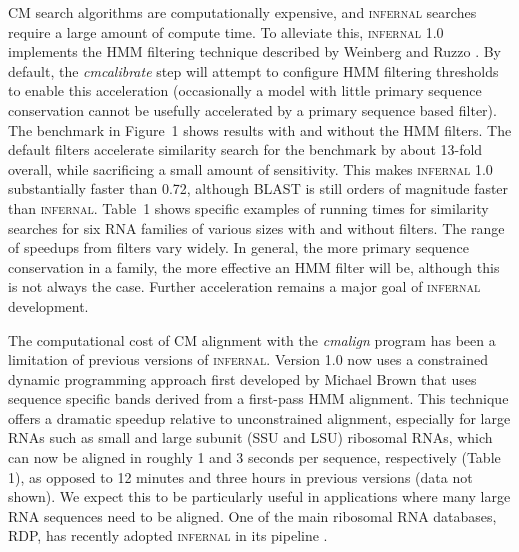 CM search algorithms are computationally expensive, and
\textsc{infernal} searches require a large amount of compute time.  To
alleviate this, \textsc{infernal} 1.0 implements the HMM filtering
technique described by Weinberg and Ruzzo \citep{WeinbergRuzzo06}. By
default, the \emph{cmcalibrate} step will attempt to configure HMM
filtering thresholds to enable this acceleration (occasionally a model
with little primary sequence conservation cannot be usefully
accelerated by a primary sequence based filter).  The benchmark in
Figure~1 shows results with and without the HMM filters. The default
filters accelerate similarity search for the benchmark by about
13-fold overall, while sacrificing a small amount of sensitivity. This
makes \textsc{infernal} 1.0 substantially faster than 0.72, although
\textsc{BLAST} is still orders of magnitude faster than
\textsc{infernal}. Table~1 shows specific examples of running times
for similarity searches for six RNA families of various sizes with and
without filters. The range of speedups from filters vary widely. In
general, the more primary sequence conservation in a family, the more
effective an HMM filter will be, although this is not always the
case. Further acceleration remains a major goal of \textsc{infernal}
development.

The computational cost of CM alignment with the \emph{cmalign} program
has been a limitation of previous versions of
\textsc{infernal}. Version 1.0 now uses a constrained dynamic
programming approach first developed by Michael Brown \citep{Brown00}
that uses sequence specific bands derived from a first-pass HMM
alignment. This technique offers a dramatic speedup relative to
unconstrained alignment, especially for large RNAs such as small and
large subunit (SSU and LSU) ribosomal RNAs, which can now be aligned
in roughly 1 and 3 seconds per sequence, respectively (Table 1), as
opposed to 12 minutes and three hours in previous versions (data not
shown). We expect this to be particularly useful in applications where
many large RNA sequences need to be aligned. One of the main ribosomal
RNA databases, RDP, has recently adopted \textsc{infernal} in its
pipeline \citep{Cole09}.

